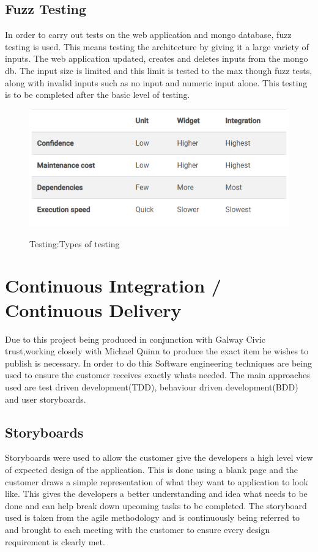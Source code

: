 \subsection{Fuzz Testing}
In order to carry out tests on the web application and mongo database, fuzz testing is used. This means testing the architecture by giving it a large variety of inputs. The web application updated, creates and deletes inputs from the mongo db. The input size is limited and this limit is tested to the max though fuzz tests, along with invalid inputs such as no input and numeric input alone. This testing is to be completed after the basic level of testing.

\begin{figure}[ht!]
    \centering
 \includegraphics[width=125mm,scale=0.5]{img/Capture.PNG}
\caption{Testing:Types of testing}
\cite{testing}
\label{fig:method}
\end{figure}

\section {Continuous Integration / Continuous Delivery}

Due to this project being produced in conjunction with Galway Civic trust,working closely with Michael Quinn to produce the exact item he wishes to publish is necessary. In order to do this Software engineering techniques are being used to ensure the customer receives exactly whats needed. The main approaches used are test driven development(TDD), behaviour driven development(BDD) and user storyboards.

\subsection{Storyboards}

Storyboards were used to allow the customer give the developers a high level view of expected design of the application. This is done using a blank page and the customer draws a simple representation of what they want to application to look like. This gives the developers a better understanding and idea what needs to be done and can help break down upcoming tasks to be completed. The storyboard used is taken from the agile methodology and is continuously being referred to and brought to each meeting with the customer to ensure every design requirement is clearly met. \cite{StoryBoard}

